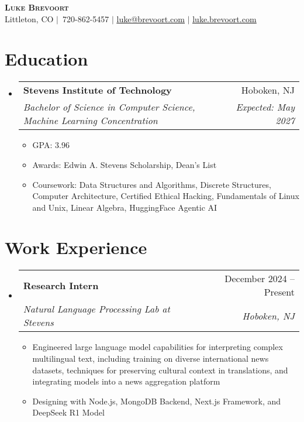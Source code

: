 \documentclass[letterpaper,11pt]{article}
\makeatletter
\newcommand{\resumeItem}[1]{
  \item\small{
    {#1 \vspace{-2pt}}
  }
}
\newcommand{\resumeSubheading}[4]{
  \vspace{-2pt}\item
    \begin{tabular*}{0.97\textwidth}[t]{l@{\extracolsep{\fill}}r}
      \textbf{#1} & #2 \\
      \textit{\small#3} & \textit{\small #4} \\
    \end{tabular*}\vspace{-7pt}
}
\newcommand{\resumeSubHeadingListStart}{\begin{itemize}[leftmargin=0.15in, label={}]}
\newcommand{\resumeSubHeadingListEnd}{\end{itemize}}
\newcommand{\resumeItemListStart}{\begin{itemize}}
\newcommand{\resumeItemListEnd}{\end{itemize}\vspace{-5pt}}
\makeatother
\begin{document}
\begin{center}
    \textbf{\scshape Luke Brevoort} \\ \vspace{1pt}
    \small Littleton, CO $|$\ 720-862-5457 $|$ \href{mailto:luke@brevoort.com}{\underline{luke@brevoort.com}} $|$ 
    \href{https://luke.brevoort.com}{\underline{luke.brevoort.com}}
\end{center}

\section{Education}
  \resumeSubHeadingListStart
    \resumeSubheading
      {Stevens Institute of Technology}{Hoboken, NJ}
      {Bachelor of Science in Computer Science, Machine Learning Concentration}{Expected: May 2027}
      \resumeItemListStart
        \resumeItem{GPA: 3.96}
        \resumeItem{Awards: Edwin A. Stevens Scholarship, Dean's List}
        \resumeItem{Coursework: Data Structures and Algorithms, Discrete Structures, Computer Architecture, Certified Ethical Hacking, Fundamentals of Linux and Unix, Linear Algebra, HuggingFace Agentic AI}
      \resumeItemListEnd
  \resumeSubHeadingListEnd

\section{Work Experience}
  \resumeSubHeadingListStart

    \resumeSubheading
      {Research Intern}{December 2024 -- Present}
      {Natural Language Processing Lab at Stevens}{Hoboken, NJ}
      \resumeItemListStart
        \resumeItem{Engineered large language model capabilities for interpreting complex multilingual text, including training on diverse international news datasets, techniques for preserving cultural context in translations, and integrating models into a news aggregation platform}
        \resumeItem{Designing with Node.js, MongoDB Backend, Next.js Framework, and DeepSeek R1 Model}
      \resumeItemListEnd

  \resumeSubHeadingListEnd

\end{document}
